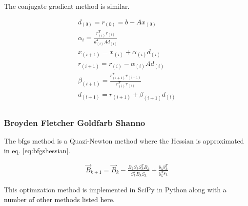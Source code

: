 The conjugate gradient method is similar.

\begin{equation}
  \begin{split}
  d_{(0)} = r_{(0)} = b - A x_{(0)} \\  
  \alpha_{i} = \frac{r^{T}_{(i)} r_{(i)}}{d^{T}_{(i)} A d_{(i)}} \\
  x_{(i+1)} = x_{(i)} + \alpha_{(i)} d_{(i)} \\
  r_{(i+1)} = r_{(i)} - \alpha_{(i)} A d_{(i)} \\
  \beta_{(i+1)} = \frac{r^{T}_{(i+1)} r_{(i+1)}} {r^{T}_{(i)} r_{(i)}} \\
  d_{(i + 1)} = r_{(i + 1)} + \beta_{(i+1)} d_{(i)}\\
  \end{split}
  \label{eq:conjugategradient}
\end{equation}


\subsubsection{Broyden Fletcher Goldfarb Shanno}

The \acrshort{bfgs} method is a Quazi-Newton method where the Hessian is approximated in eq. \ref{eq:bfgshessian}\cite{nocedalwright1}.

\begin{equation}
  \begin{split}
  \vec{B}_{k+1} = \vec{B}_{k} - \frac{B_{k}S_{k}S_{k}^{T}B_k}{S_{k}^{T} B_k S_k} + \frac{y_k y_k^T}{y_k^T s_k} 
  \end{split}
  \label{eq:bfgshessian}
\end{equation}

This optimzation method is implemented in SciPy in Python along with a number of other methods listed here.

